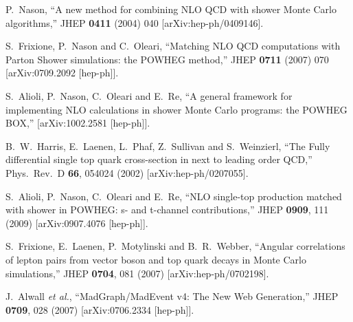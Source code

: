 \documentclass[paper]{JHEP3}
\begin{document}
\begin{thebibliography}{10}

  P.~Nason,
  ``A new method for combining NLO QCD with shower Monte Carlo algorithms,''
  JHEP {\bf 0411} (2004) 040
  [arXiv:hep-ph/0409146].

  S.~Frixione, P.~Nason and C.~Oleari,
``Matching NLO QCD computations with Parton Shower simulations: the POWHEG
method,''
  JHEP {\bf 0711} (2007) 070
  [arXiv:0709.2092 [hep-ph]].

  S.~Alioli, P.~Nason, C.~Oleari and E.~Re,
``A general framework for implementing NLO calculations in shower Monte Carlo
  programs: the POWHEG BOX,''
  [arXiv:1002.2581 [hep-ph]].

  B.~W.~Harris, E.~Laenen, L.~Phaf, Z.~Sullivan and S.~Weinzierl,
  ``The Fully differential single top quark cross-section in next to leading
  order QCD,''
  Phys.\ Rev.\  D {\bf 66}, 054024 (2002)
  [arXiv:hep-ph/0207055].


  S.~Alioli, P.~Nason, C.~Oleari and E.~Re,
  ``NLO single-top production matched with shower in POWHEG: s- and t-channel
  contributions,''
  JHEP {\bf 0909}, 111 (2009)
  [arXiv:0907.4076 [hep-ph]].

  S.~Frixione, E.~Laenen, P.~Motylinski and B.~R.~Webber,
  ``Angular correlations of lepton pairs from vector boson and top quark decays
  in Monte Carlo simulations,''
  JHEP {\bf 0704}, 081 (2007)
  [arXiv:hep-ph/0702198].

  J.~Alwall {\it et al.},
  ``MadGraph/MadEvent v4: The New Web Generation,''
  JHEP {\bf 0709}, 028 (2007)
  [arXiv:0706.2334 [hep-ph]].



\end{thebibliography}
\end{document}
